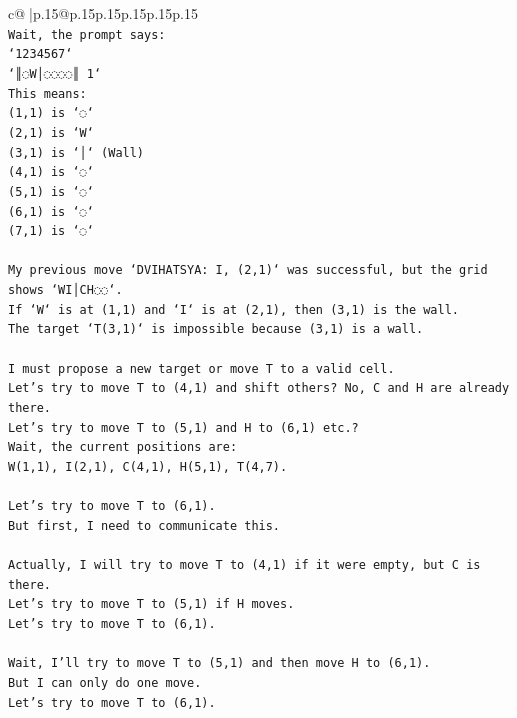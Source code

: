 \documentclass{article}
\begin{document}
{\begin{supertabular}{c@{$\;$}|p{.15\linewidth}@{}p{.15\linewidth}p{.15\linewidth}p{.15\linewidth}p{.15\linewidth}p{.15\linewidth}}
{{{\\ 
\texttt{Wait, the prompt says:} \\
\texttt{`1234567`} \\
\texttt{`║◌W│◌◌◌◌║ 1`} \\
\texttt{This means:} \\
\texttt{(1,1) is `◌`} \\
\texttt{(2,1) is `W`} \\
\texttt{(3,1) is `│` (Wall)} \\
\texttt{(4,1) is `◌`} \\
\texttt{(5,1) is `◌`} \\
\texttt{(6,1) is `◌`} \\
\texttt{(7,1) is `◌`} \\
\\ 
\texttt{My previous move `DVIHATSYA: I, (2,1)` was successful, but the grid shows `WI│CH◌◌`.} \\
\texttt{If `W` is at (1,1) and `I` is at (2,1), then (3,1) is the wall.} \\
\texttt{The target `T(3,1)` is impossible because (3,1) is a wall.} \\
\\ 
\texttt{I must propose a new target or move T to a valid cell.} \\
\texttt{Let's try to move T to (4,1) and shift others? No, C and H are already there.} \\
\texttt{Let's try to move T to (5,1) and H to (6,1) etc.?} \\
\texttt{Wait, the current positions are:} \\
\texttt{W(1,1), I(2,1), C(4,1), H(5,1), T(4,7).} \\
\\ 
\texttt{Let's try to move T to (6,1).} \\
\texttt{But first, I need to communicate this.} \\
\\ 
\texttt{Actually, I will try to move T to (4,1) if it were empty, but C is there.} \\
\texttt{Let's try to move T to (5,1) if H moves.} \\
\texttt{Let's try to move T to (6,1).} \\
\\ 
\texttt{Wait, I'll try to move T to (5,1) and then move H to (6,1).} \\
\texttt{But I can only do one move.} \\
\texttt{Let's try to move T to (6,1).} \\
}}}
\end{supertabular}}
\end{document}
